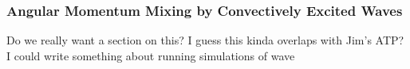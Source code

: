 {\color{purple}
\subsubsection{Angular Momentum Mixing by Convectively Excited Waves}}

Do we really want a section on this?  I guess this kinda overlaps with Jim's ATP?  I could write something about running simulations of wave
